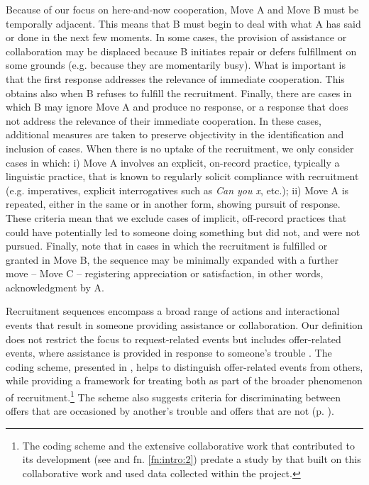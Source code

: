 \documentclass[output=paper,modfonts,nonflat]{langsci/langscibook}
\begin{document}
Because of our focus on here-and-now cooperation, Move A and Move B must be temporally adjacent. This means that B must begin to deal with what A has said or done in the next few moments. In some cases, the provision of assistance or collaboration may be displaced because B initiates repair or defers fulfillment on some grounds (e.g. because they are momentarily busy). What is important is that the first response addresses the relevance of immediate cooperation. This obtains also when B refuses to fulfill the recruitment. Finally, there are cases in which B may ignore Move A and produce no response, or a response that does not address the relevance of their immediate cooperation. In these cases, additional measures are taken to preserve objectivity in the identification and inclusion of cases. When there is no uptake of the recruitment, we only consider cases in which: i) Move A involves an explicit, on-record practice, typically a linguistic practice, that is known to regularly solicit compliance with recruitment (e.g. imperatives, explicit interrogatives such as \textit{Can you x}, etc.); ii) Move A is repeated, either in the same or in another form, showing pursuit of response. These criteria mean that we exclude cases of implicit, off-record practices that could have potentially led to someone doing something but did not, and were not pursued. Finally, note that in cases in which the recruitment is fulfilled or granted in Move B, the sequence may be minimally expanded with a further move  --  Move C  --  registering appreciation or satisfaction, in other words, acknowledgment by A.

Recruitment sequences encompass a broad range of actions and interactional events that result in someone providing assistance or collaboration. Our definition does not restrict the focus to request-related events but includes offer-related events, where assistance is provided in response to someone’s trouble \citep{Curl2006}. The coding scheme, presented in , helps to distinguish offer-related events from others, while providing a framework for treating both as part of the broader phenomenon of recruitment.\footnote{The coding scheme and the extensive collaborative work that contributed to its development (see  and fn. \ref{fn:intro:2}) predate a study by \citet{KendrickDrew2016} that built on this collaborative work and used data collected within the project.} The scheme also suggests criteria for discriminating between offers that are occasioned by another’s trouble and offers that are not (p. \pageref{par:coding:offers}). 
\end{document}
